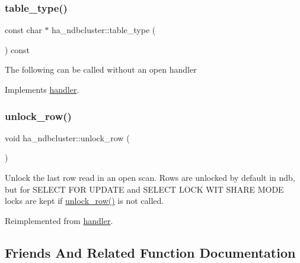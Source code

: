 \subsubsection{\texorpdfstring{table\+\_\+type()}{table\_type()}}
{\footnotesize\ttfamily const char $\ast$ ha\+\_\+ndbcluster\+::table\+\_\+type (\begin{DoxyParamCaption}{ }\end{DoxyParamCaption}) const\hspace{0.3cm}{\ttfamily [virtual]}}

The following can be called without an open handler 

Implements \mbox{\hyperlink{classhandler_ad38f5d3f1e026a0af32b5542aa5ac2f9}{handler}}.

\mbox{\label{classha__ndbcluster_aecef434c45b2c6c35a584274c5079e4b}} 
\subsubsection{\texorpdfstring{unlock\+\_\+row()}{unlock\_row()}}
{\footnotesize\ttfamily void ha\+\_\+ndbcluster\+::unlock\+\_\+row (\begin{DoxyParamCaption}{ }\end{DoxyParamCaption})\hspace{0.3cm}{\ttfamily [virtual]}}

Unlock the last row read in an open scan. Rows are unlocked by default in ndb, but for S\+E\+L\+E\+CT F\+OR U\+P\+D\+A\+TE and S\+E\+L\+E\+CT L\+O\+CK W\+IT S\+H\+A\+RE M\+O\+DE locks are kept if \mbox{\hyperlink{classha__ndbcluster_aecef434c45b2c6c35a584274c5079e4b}{unlock\+\_\+row()}} is not called. 

Reimplemented from \mbox{\hyperlink{classhandler}{handler}}.



\subsection{Friends And Related Function Documentation}
\mbox{\label{classha__ndbcluster_ae2bd9470fe7beb5dc3481654718f39b7}} 
